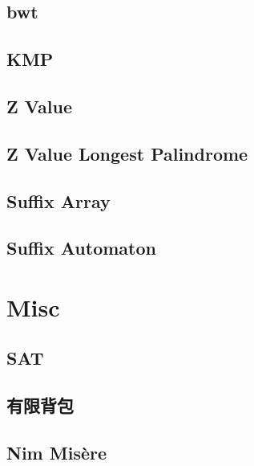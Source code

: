 \documentclass[10pt,twocolumn,oneside]{article}
\begin{document}
    \subsection{bwt}
    
    \subsection{KMP}
    
    \subsection{Z Value}
    
    \subsection{Z Value Longest Palindrome}
    
    \subsection{Suffix Array}
    
    \subsection{Suffix Automaton}
    
    \section{Misc}
    \subsection{SAT}
    
    \subsection{有限背包}
    
    \subsection{Nim Misère}
    
	\newpage
\end{document}
